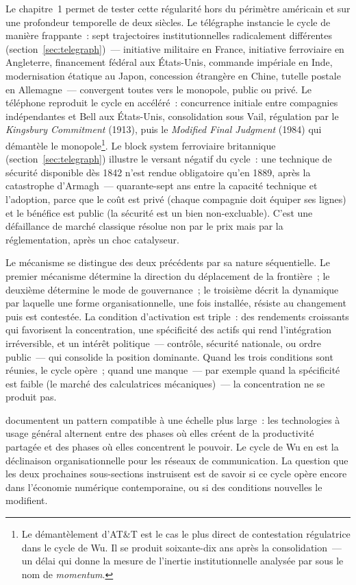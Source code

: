 Le chapitre~1 permet de tester cette régularité hors du périmètre américain et sur une profondeur temporelle de deux siècles. Le télégraphe instancie le cycle de manière frappante~: sept trajectoires institutionnelles radicalement différentes (section~\ref{sec:telegraph})~--- initiative militaire en France, initiative ferroviaire en Angleterre, financement fédéral aux États-Unis, commande impériale en Inde, modernisation étatique au Japon, concession étrangère en Chine, tutelle postale en Allemagne~--- convergent toutes vers le monopole, public ou privé. Le téléphone reproduit le cycle en accéléré~: concurrence initiale entre compagnies indépendantes et Bell aux États-Unis, consolidation sous Vail, régulation par le \emph{Kingsbury Commitment} (1913), puis le \emph{Modified Final Judgment} (1984) qui démantèle le monopole\footnote{Le démantèlement d'AT\&T est le cas le plus direct de contestation régulatrice dans le cycle de Wu. Il se produit soixante-dix ans après la consolidation~--- un délai qui donne la mesure de l'inertie institutionnelle analysée par \textcite{hughes_networks_1983} sous le nom de \emph{momentum}.}. Le block system ferroviaire britannique (section~\ref{sec:telegraph}) illustre le versant négatif du cycle~: une technique de sécurité disponible dès 1842 n'est rendue obligatoire qu'en 1889, après la catastrophe d'Armagh~--- quarante-sept ans entre la capacité technique et l'adoption, parce que le coût est privé (chaque compagnie doit équiper ses lignes) et le bénéfice est public (la sécurité est un bien non-excluable). C'est une défaillance de marché classique résolue non par le prix mais par la réglementation, après un choc catalyseur.

Le mécanisme se distingue des deux précédents par sa nature séquentielle. Le premier mécanisme détermine la direction du déplacement de la frontière~; le deuxième détermine le mode de gouvernance~; le troisième décrit la dynamique par laquelle une forme organisationnelle, une fois installée, résiste au changement puis est contestée. La condition d'activation est triple~: des rendements croissants qui favorisent la concentration, une spécificité des actifs qui rend l'intégration irréversible, et un intérêt politique~--- contrôle, sécurité nationale, ou ordre public~--- qui consolide la position dominante. Quand les trois conditions sont réunies, le cycle opère~; quand une manque~--- par exemple quand la spécificité est faible (le marché des calculatrices mécaniques)~--- la concentration ne se produit pas.

\textcite{acemoglu_johnson_2023} documentent un pattern compatible à une échelle plus large~: les technologies à usage général alternent entre des phases où elles créent de la productivité partagée et des phases où elles concentrent le pouvoir. Le cycle de Wu en est la déclinaison organisationnelle pour les réseaux de communication. La question que les deux prochaines sous-sections instruisent est de savoir si ce cycle opère encore dans l'économie numérique contemporaine, ou si des conditions nouvelles le modifient.

